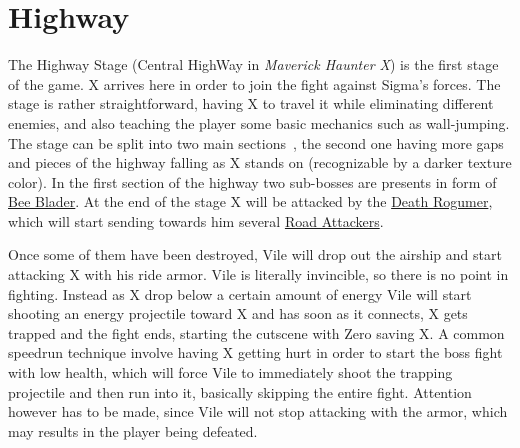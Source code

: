 \section{Highway}
The Highway Stage (Central HighWay in \textit{Maverick Haunter X}) is the first stage of the game. X arrives here in order to join the fight against Sigma's forces.
 The stage is rather straightforward, having X to travel it while eliminating different enemies, and also teaching the player some basic mechanics such as wall-jumping.  The stage can be split into two main sections~\cite{stratwiki:HighWay}, the second one having more gaps and pieces of the highway falling as X stands on (recognizable by a darker texture color). In the first section of the highway two sub-bosses are presents in form of \hyperlink{miniboss:Bee_Blader}{Bee Blader}. At the end of the stage X will be attacked by the \hyperlink{veichle:Death_Rogumer}{Death Rogumer}, which will start sending towards him several \hyperlink{enem:Road_Attackers}{Road Attackers}.

 
 Once some of them have been destroyed, Vile will drop out the airship and start attacking X with his ride armor. Vile is literally invincible, so there is 
 no point in fighting. Instead as X drop below a certain amount of energy Vile will start shooting an energy projectile toward X and has soon as it connects, X gets trapped and the fight ends, starting the cutscene with Zero saving X. A common speedrun  technique involve having X getting hurt in order to start the boss fight with low health, which will force Vile to immediately shoot the trapping projectile and then run into it, basically skipping the entire fight.  Attention however has to be made, since Vile will not stop attacking with the armor, which may results in the player being defeated.
 
